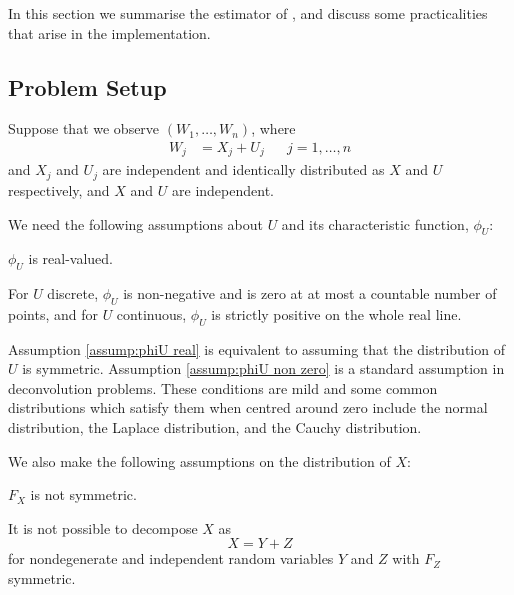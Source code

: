 	In this section we summarise the estimator of \cite{Delaigle2016-la}, and discuss some practicalities that arise in the implementation. 

	\subsection{Problem Setup}
	Suppose that we observe $(W_1, \dots, W_n)$, where
	\begin{align}
		W_j &= X_j + U_j &&j = 1, \dots, n
	\end{align}
	and $X_j$ and $U_j$ are independent and identically distributed as $X$ and $U$ respectively, and $X$ and $U$ are independent. 


	We need the following assumptions about $U$ and its characteristic function, $\phi_U$:
	\begin{assumption}
	\label{assump:phiU real}
		$\phi_U$ is real-valued.
	\end{assumption}
	\begin{assumption}
	\label{assump:phiU non zero}
		For $U$ discrete, $\phi_U$ is non-negative and is zero at at most a countable number of points, and for $U$ continuous, $\phi_U$ is strictly positive on the whole real line.
	\end{assumption}

	Assumption \ref{assump:phiU real} is equivalent to assuming that the distribution of $U$ is symmetric. Assumption \ref{assump:phiU non zero} is a standard assumption in deconvolution problems. These conditions are mild and some common distributions which satisfy them when centred around zero include the normal distribution, the Laplace distribution, and the Cauchy distribution.


	We also make the following assumptions on the distribution of $X$:
	\begin{assumption}
	\label{assumpt: X not symmetric}
		$F_X$ is not symmetric.
	\end{assumption}
	\begin{assumption}
		\label{assump: X indecomposable}
		It is not possible to decompose $X$ as
		\begin{equation}
			X = Y + Z
		\end{equation}
		for nondegenerate and independent random variables $Y$ and $Z$ with $F_Z$ symmetric.
	\end{assumption}

